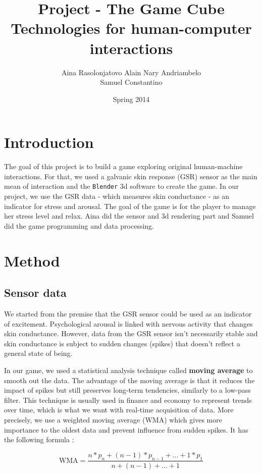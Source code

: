 \documentclass[12pt,a4paper]{article}
\title{\LARGE \textbf{Project - The Game Cube\textregistered}\\
	\bigskip
	\bigskip
	\large Technologies for human-computer interactions}
\author{Aina Rasolonjatovo Alain Nary Andriambelo \\ Samuel Constantino}
\date{Spring 2014}
\begin{document}
	\maketitle


\section{Introduction}

The goal of this project is to build a game exploring original human-machine interactions. For that, we used a galvanic skin response (GSR) sensor as the main mean of interaction and the \texttt{Blender} 3d software to create the game. In our project, we use the GSR data - which measures skin conductance - as an indicator for stress and arousal. The goal of the game is for the player to manage her stress level and relax. Aina did the sensor and 3d rendering part and Samuel did the game programming and data processing.

\section{Method}

\subsection{Sensor data}

We started from the premise that the GSR sensor could be used as an indicator of excitement. Psychological arousal is linked with nervous activity that changes skin conductance. However, data from the GSR sensor isn't necessarily stable and skin conductance is subject to sudden changes (spikes) that doesn't reflect a general state of being.

In our game, we used a statistical analysis technique called \textbf{moving average} to smooth out the data. The advantage of the moving average is that it reduces the impact of spikes but still preserves long-term tendencies, similarly to a low-pass filter. This technique is usually used in finance and economy to represent trends over time, which is what we want with real-time acquisition of data. More precisely, we use a weighted moving average (WMA) which gives more importance to the oldest data and prevent influence from sudden spikes. It has the following formula : 

\begin{equation}
\text{WMA} = \frac{n * p_n + (n - 1) * p_{n-1} + ... + 1 * p_{1}}{n + (n-1) + ... + 1}
\end{equation}
\end{document}
